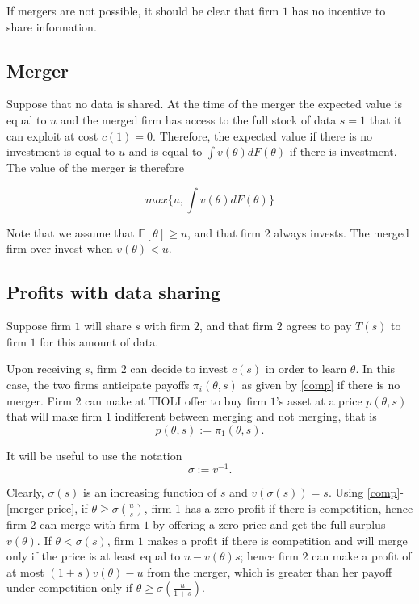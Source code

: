 \documentclass[a4paper,leqno]{article}%
\renewcommand{\t}{\theta}
\newcommand{\E}{\mathbb E}
\renewcommand{\t}{\theta}
\newcommand{\s}{\sigma}
\begin{document}
If mergers are not possible, it should be clear that firm $1$ has no incentive to share information. 


\subsection{Merger}
%
Suppose that no data is shared. At the time of the merger the expected value is equal to $u$ and the merged firm has access to the full stock of data $s=1$ that it can exploit at cost $c(1)=0$. Therefore, the expected value if there is no investment is equal to $u$ and is equal to $\int v(\t)dF(\t)$ if there is investment. The value of the merger is therefore
%

$$max\{u,\int v(\t)dF(\t)\}$$

%
Note that we assume that $\E[\t]\geq u$, and that firm 2 always invests. The merged firm over-invest when $v(\t)<u$.

\subsection{Profits with data sharing}

Suppose firm $1$ will share $s$ with firm $2$, and that firm $2$ agrees to pay $T(s)$ to firm $1$ for this amount of data. 

Upon receiving $s$, firm $2$ can decide to invest $c(s)$ in order to learn $\t$. In this case, the two firms anticipate payoffs $\pi_i(\t,s)$ as given by \eqref{comp} if there is no merger. Firm $2$ can make at TIOLI offer to buy firm $1$'s asset at a price $p(\t,s)$ that will make firm $1$ indifferent between merging and not merging, that is 
%
\begin{equation}\label{merger-price}
    p(\t,s):=\pi_1(\t,s).  
\end{equation}
%




It will be useful to use the notation
%
\[
\s:=v^{-1}.
\]

Clearly, $\s(s)$ is an increasing function of $s$ and $v(\s(s))=s$. Using \eqref{comp}-\eqref{merger-price}, if $\t\geq \s(\frac{u}{s})$, firm $1$ has a zero profit if there is competition, hence firm $2$ can merge with firm $1$ by offering a zero price and get the full surplus $v(\t)$. If $\t< \s(s)$, firm $1$ makes a profit if there is competition and will merge only if the price is at least equal to $u-v(\t)s$; hence firm $2$ can make a profit of at most $(1+s)v(\t)-u$ from the merger, which is greater than her payoff under competition only if $\t\geq \s(\frac{u}{1+s})$. 
%
\end{document}
